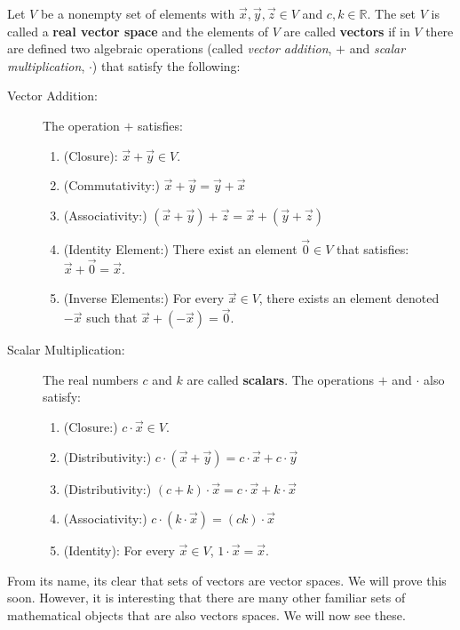 \begin{definition} \label{def:vector:space}
Let  $V$ be a nonempty set of elements with $\vec{x}, \vec{y}, \vec{z} \in V$ and $c,k \in \mathbb{R}$.  The set $V$ is called a \textbf{real vector space} and the elements of $V$ are called \textbf{vectors} if in $V$ there are defined two algebraic operations (called \emph{vector addition}, $+$ and \emph{scalar multiplication}, $\cdot$) that satisfy the following:
 
\begin{description}
 \item[Vector Addition:] The operation $+$ satisfies:
 
\begin{enumerate}[itemindent=-0.25in]
\item (Closure):  $\vec{x}+\vec{y} \in V$.
 \item (Commutativity:)  $\vec{x} +\vec{y} = \vec{y}+\vec{x}$
 \item (Associativity:) $(\vec{x} + \vec{y}) + \vec{z} = \vec{x} + (\vec{y} + \vec{z})$ 
 \item (Identity Element:)  There exist an element $\vec{0} \in V$ that satisfies: $\vec{x} + \vec{0} = \vec{x}$.   
 \item (Inverse Elements:)  For every $\vec{x} \in V$, there exists an element denoted $-\vec{x}$ such that  $\vec{x} + (-\vec{x}) = \vec{0}$. 
\end{enumerate}

\item[Scalar Multiplication:]  The real numbers $c$ and $k$ are called \textbf{scalars}.  The operations $+$ and $\cdot$ also satisfy:
\begin{enumerate}[start=6,itemindent=-0.25in]
\item (Closure:) $c \cdot \vec{x} \in V$.  
 \item (Distributivity:) $c \cdot (\vec{x} + \vec{y}) = c\cdot  \vec{x} + c\cdot \vec{y}$
 \item (Distributivity:) $(c+k) \cdot \vec{x} = c\cdot \vec{x} + k\cdot  \vec{x}$ 
 \item (Associativity:) $c\cdot (k\cdot \vec{x}) = (ck)\cdot  \vec{x}$
 \item (Identity):  For every $\vec{x} \in V$, $1 \cdot  \vec{x} = \vec{x}$.  
\end{enumerate}
\end{description}
\end{definition}

From its name, its clear that sets of vectors are vector spaces.  We will prove this soon.  However, it is interesting that there are many other familiar sets of mathematical objects that are also vectors spaces.  We will now see these. 

